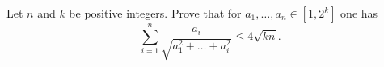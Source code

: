 Let $n$ and $k$ be positive integers. Prove that for $a_1, \ldots, a_n \in [1, 2^k]$ one has
\[
\sum_{i=1}^{n} \frac{a_i}{\sqrt{a_1^2 + \ldots + a_i^2}} \leq 4\sqrt{kn}.
\]
